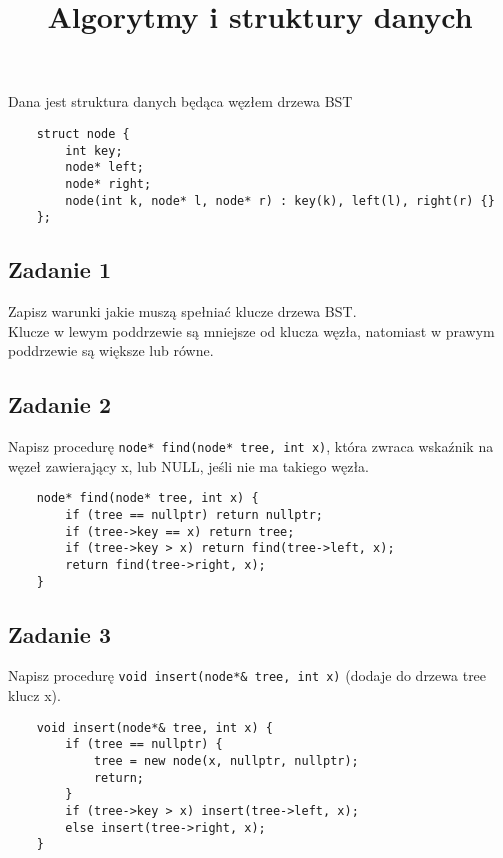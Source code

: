 \documentclass{article}
\begin{document}
\title{Algorytmy i struktury danych}
\author{}
\date{}
\maketitle

Dana jest struktura danych będąca węzłem drzewa BST
\begin{lstlisting}
    struct node {
        int key;
        node* left;
        node* right;
        node(int k, node* l, node* r) : key(k), left(l), right(r) {}
    };
\end{lstlisting}

\subsection*{Zadanie 1}
Zapisz warunki jakie muszą spełniać klucze drzewa BST. \\
\noindent
Klucze w lewym poddrzewie są mniejsze od klucza węzła, natomiast w prawym poddrzewie są większe lub równe.

\subsection*{Zadanie 2}
Napisz procedurę \verb|node* find(node* tree, int x)|, która zwraca wskaźnik na węzeł
zawierający x, lub NULL, jeśli nie ma takiego węzła.
\begin{lstlisting}
    node* find(node* tree, int x) {
        if (tree == nullptr) return nullptr;
        if (tree->key == x) return tree;
        if (tree->key > x) return find(tree->left, x);
        return find(tree->right, x);
    }
\end{lstlisting}

\subsection*{Zadanie 3}
Napisz procedurę \verb|void insert(node*& tree, int x)| (dodaje do drzewa tree klucz x).
\begin{lstlisting}
    void insert(node*& tree, int x) {
        if (tree == nullptr) {
            tree = new node(x, nullptr, nullptr);
            return;
        }
        if (tree->key > x) insert(tree->left, x);
        else insert(tree->right, x);
    }
\end{lstlisting}

\pagebreak
\end{document}
